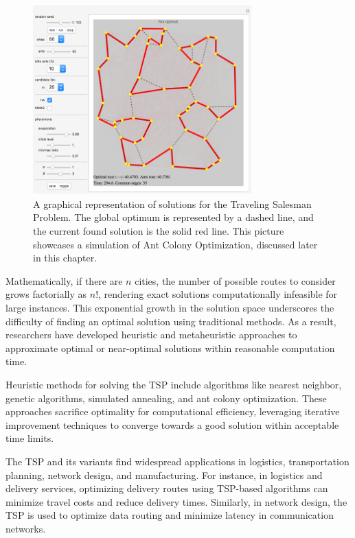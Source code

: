 \documentclass[11pt]{report}
\begin{document}
        \begin{figure}[h!]
            \centering
            \includegraphics[width=0.75\textwidth,keepaspectratio]{Images/aco_tsp.png}
            \caption{A graphical representation of solutions for the Traveling Salesman Problem. The global optimum is represented by a dashed line, and the current found solution is the solid red line. This picture showcases a simulation of Ant Colony Optimization, discussed later in this chapter.}
            \label{fig:aco-demo}
        \end{figure}
        
        Mathematically, if there are $n$ cities, the number of possible routes to consider grows factorially as $n!$, rendering exact solutions computationally infeasible for large instances. This exponential growth in the solution space underscores the difficulty of finding an optimal solution using traditional methods. As a result, researchers have developed heuristic and metaheuristic approaches to approximate optimal or near-optimal solutions within reasonable computation time.
        
        Heuristic methods for solving the TSP include algorithms like nearest neighbor, genetic algorithms, simulated annealing, and ant colony optimization. These approaches sacrifice optimality for computational efficiency, leveraging iterative improvement techniques to converge towards a good solution within acceptable time limits.
        
        The TSP and its variants find widespread applications in logistics, transportation planning, network design, and manufacturing. For instance, in logistics and delivery services, optimizing delivery routes using TSP-based algorithms can minimize travel costs and reduce delivery times. Similarly, in network design, the TSP is used to optimize data routing and minimize latency in communication networks.
        
\end{document}
